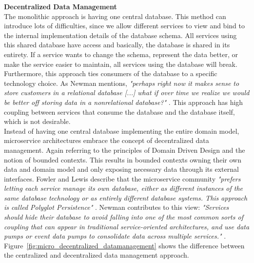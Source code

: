 \noindent\textbf{Decentralized Data Management} \\
The monolithic approach is having one central database. This method can introduce lots of difficulties, since we allow different services to view and bind to the internal implementation details of the database schema. All services using this shared database have access and basically, the database is shared in its entirety. If a service wants to change the schema, represent the data better, or make the service easier to maintain, all services using the database will break. Furthermore, this approach ties consumers of the database to a specific technology choice. As Newman mentions, \textit{"perhaps right now it makes sense to store customers in a relational database [...] what if over time we realize we would be better off storing data in a nonrelational database?"}  \cite[p. 41]{newman2015building}. This approach has high coupling between services that consume the database and the database itself, which is not desirable. \\

\noindent
Instead of having one central database implementing the entire domain model, microservice architectures embrace the concept of decentralized data management. Again referring to the principles of Domain Driven Design and the notion of bounded contexts. This results in bounded contexts owning their own data and domain model and only exposing necessary data through its external interfaces. Fowler and Lewis describe that the microservice community  \textit{"prefers letting each service manage its own database, either as different instances of the same database technology or as entirely different database systems. This approach is called Polyglot Persistence"} \cite[p. 9]{lewis2014microservices}. Newman contributes to this view: \textit{"Services should hide their database to avoid falling into one of the most common sorts of coupling that can appear in traditional service-oriented architectures, and use data pumps or event data pumps to consolidate data across multiple services."} \cite[p. 247]{newman2015building}. Figure~\ref{fig:micro_decentralized_datamanagement} shows the difference between the centralized and decentralized data management approach.

